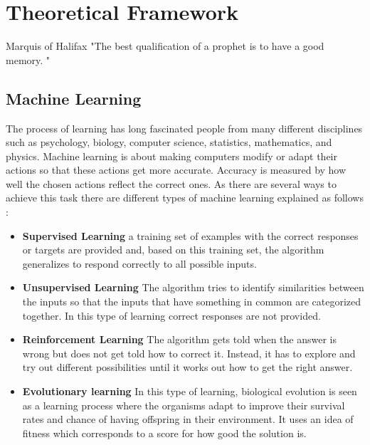 \chapter{Theoretical Framework}
\label{ch:theosm}

\begin{chapterquote}{Marquis of Halifax}
 "The best qualification of a prophet is to have a good memory. "
 \end{chapterquote}


\section{Machine Learning}
The process of learning has long fascinated people from many different disciplines such as psychology, biology, computer science, statistics, mathematics, and physics. 
Machine learning is about making computers modify or adapt their actions so that these actions get more accurate. Accuracy is measured by how well the chosen actions reflect the correct ones. As there are several ways to achieve this task there are different types of machine learning explained as follows \cite{marsland2015machine}:

\begin{itemize}
\item \textbf{Supervised Learning} a training set of examples with the correct responses or targets are provided and, based on this training set, the algorithm generalizes to respond correctly to all possible inputs.

\item \textbf{Unsupervised Learning} The algorithm tries to identify similarities between the inputs so that the inputs that have something in common are categorized together. In this type of learning correct responses are not provided.

\item \textbf{Reinforcement Learning} The algorithm gets told when the answer is wrong but does not get told how to correct it. Instead, it has to explore and try out different possibilities until it works out how to get the right answer. 

\item \textbf{Evolutionary learning} In this type of learning, biological evolution is seen as a learning process where the organisms adapt to improve their survival rates and chance of having offspring in their environment. It uses an idea of fitness which corresponds to a score for how good the solution is. 
\end{itemize}

